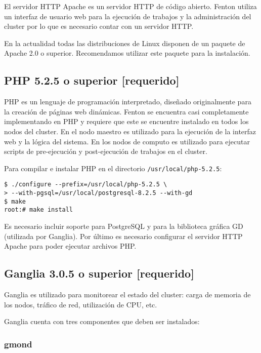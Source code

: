 \documentclass[a4paper,10pt,spanish]{article}
\begin{document}
El servidor HTTP Apache\cite{apache} es un servidor HTTP de c\'{o}digo abierto. Fenton utiliza un interfaz de usuario web para la ejecuci\'{o}n de trabajos y la administraci\'{o}n del cluster por lo que es necesario contar con un servidor HTTP.

En la actualidad todas las distribuciones de Linux disponen de un paquete de Apache 2.0 o superior. Recomendamos utilizar este paquete para la instalaci\'{o}n.

\subsection{PHP 5.2.5 o superior \small{[requerido]}}

PHP\cite{php} es un lenguaje de programaci\'{o}n interpretado, dise\~{n}ado originalmente para la creaci\'{o}n de p\'{a}ginas web din\'{a}micas. Fenton se encuentra casi completamente implementando en PHP y requiere que este se encuentre instalado en todos los nodos del cluster. En el nodo maestro es utilizado para la ejecuci\'{o}n de la interfaz web y la l\'{o}gica del sistema. En los nodos de computo es utilizado para ejecutar scripts de pre-ejecuci\'{o}n y post-ejecuci\'{o}n de trabajos en el cluster.

Para compilar e instalar PHP en el directorio \mbox{\texttt{/usr/local/php-5.2.5}}:

\begin{verbatim}
$ ./configure --prefix=/usr/local/php-5.2.5 \
> --with-pgsql=/usr/local/postgresql-8.2.5 --with-gd 
$ make 
root:# make install
\end{verbatim}

Es necesario incluir soporte para PostgreSQL y para la biblioteca gr\'{a}fica GD (utilizada por Ganglia). Por \'{u}ltimo es necesario configurar el servidor HTTP Apache para poder ejecutar archivos PHP.

\subsection{Ganglia 3.0.5 o superior \small{[requerido]}}

Ganglia es utilizado para monitorear el estado del cluster: carga de memoria de los nodos, tr\'{a}fico de red, utilizaci\'{o}n de CPU, etc. 

Ganglia cuenta con tres componentes que deben ser instalados:

\subsubsection{gmond}
\end{document}
